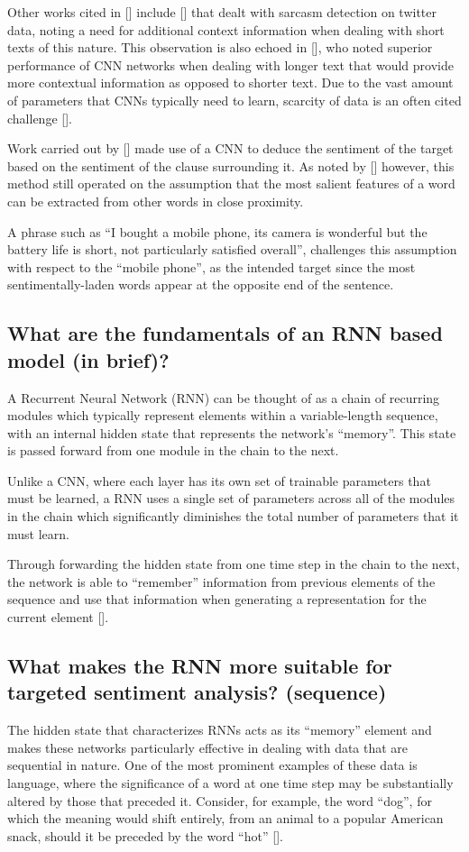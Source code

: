 \documentclass[12pt, a4paper]{report}
\theoremstyle{definition}
\theoremstyle{definition}%
\theoremstyle{definition}%
\theoremstyle{definition}%
\theoremstyle{definition}%
\theoremstyle{definition}%
\renewcommand{\cite}[1]{[\citealp{#1}]}
\begin{document}
Other works cited in \cite{young2017} include \cite{poria2016} that dealt with sarcasm detection on twitter data, noting a need for additional context information when dealing with short texts of this nature. This observation is also echoed in \cite{johnsonzhang2015}, who noted superior performance of CNN networks when dealing with longer text that would provide more contextual information as opposed to shorter text. Due to the vast amount of parameters that CNNs typically need to learn, scarcity of data is an often cited challenge \cite{young2017}.

Work carried out by \cite{chen2016} made use of a CNN to deduce the sentiment of the target based on the sentiment of the clause surrounding it. As noted by \cite{chen2017} however, this method still operated on the assumption that the most salient features of a word can be extracted from other words in close proximity.

A phrase such as \enquote{I bought a mobile phone, its camera is wonderful but the battery life is short, not particularly satisfied overall}, challenges this assumption with respect to the \enquote{mobile phone}, as the intended target since the most sentimentally-laden words appear at the opposite end of the sentence.  

\subsection{What are the fundamentals of an RNN based model (in brief)?}
A Recurrent Neural Network (RNN) can be thought of as a chain of recurring modules which typically represent elements within a variable-length sequence, with an internal hidden state that represents the network's \enquote{memory}. This state is passed forward from one module in the chain to the next.

Unlike a CNN, where each layer has its own set of trainable parameters that must be learned, a RNN uses a single set of parameters across all of the modules in the chain which significantly diminishes the total number of parameters that it must learn.

Through forwarding the hidden state from one time step in the chain to the next, the network is able to \enquote{remember} information from previous elements of the sequence and use that information when generating a representation for the current element \cite{tang2016b}. 

\subsection{What makes the RNN more suitable for targeted sentiment analysis? (sequence)}
The hidden state that characterizes RNNs acts as its \enquote{memory} element and makes these networks particularly effective in dealing with data that are sequential in nature. One of the most prominent examples of these data is language, where the significance of a word at one time step may be substantially altered by those that preceded it. Consider, for example, the word \enquote{dog}, for which the meaning would shift entirely, from an animal to a popular American snack, should it be preceded by the word \enquote{hot} \cite{young2017}.
\end{document}
